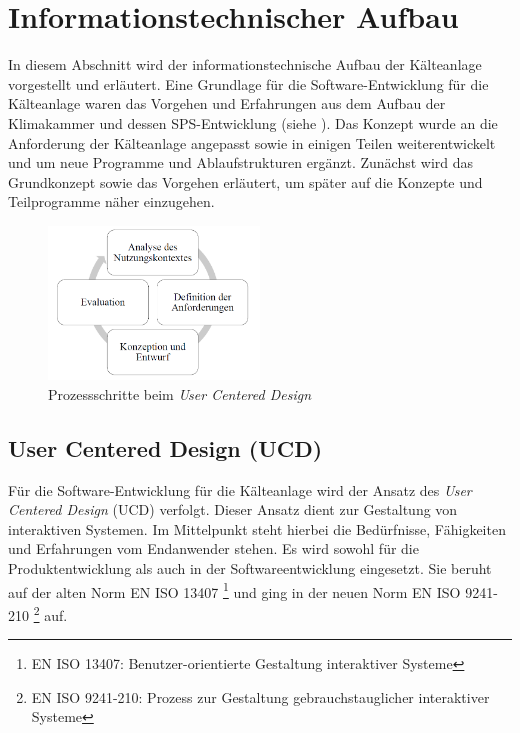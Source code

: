 \section{Informationstechnischer Aufbau}
\label{sec:Informationstechnischer Aufbau}



In diesem Abschnitt wird der informationstechnische Aufbau der Kälteanlage vorgestellt und erläutert. Eine Grundlage für die Software-Entwicklung für die Kälteanlage waren das Vorgehen und Erfahrungen aus dem Aufbau der Klimakammer und dessen SPS-Entwicklung (siehe \citep{Nuerenberg2015}). Das Konzept wurde an die Anforderung der Kälteanlage angepasst sowie in einigen Teilen weiterentwickelt und um neue Programme und Ablaufstrukturen ergänzt. Zunächst wird das Grundkonzept sowie das Vorgehen erläutert, um später auf die Konzepte und Teilprogramme näher einzugehen. 

\begin{figure}[htb]
\centering		\includegraphics[width=0.50\textwidth]{Pictures/UCD.png}
\caption{Prozessschritte beim \textit{User Centered Design} \citep{Nuerenberg2015}}
\label{fig:}
\end{figure}

\subsection{User Centered Design (UCD)}
\label{subsec: UCD}

Für die Software-Entwicklung für die Kälteanlage wird der Ansatz des \textit{User Centered Design} (UCD) verfolgt. Dieser Ansatz dient zur Gestaltung von interaktiven Systemen. Im Mittelpunkt steht hierbei die Bedürfnisse, Fähigkeiten und Erfahrungen vom Endanwender stehen. Es wird sowohl für die Produktentwicklung als auch in der Softwareentwicklung eingesetzt. Sie beruht auf der alten Norm  EN ISO 13407 \footnote{EN ISO 13407: Benutzer-orientierte Gestaltung interaktiver Systeme} und ging in der neuen Norm EN ISO 9241-210 \footnote{EN ISO 9241-210: Prozess zur Gestaltung gebrauchstauglicher interaktiver Systeme}  auf. \citep{Normung2010}

